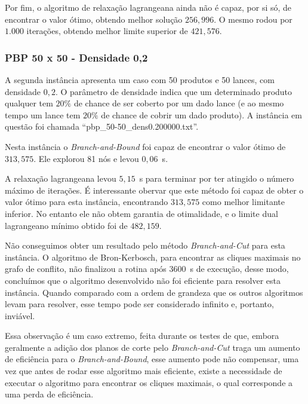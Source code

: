 \documentclass{article}
\begin{document}
    Por fim, o algoritmo de relaxação lagrangeana ainda não é capaz, por si só, de encontrar o valor ótimo, obtendo melhor solução $256{,}996$. O mesmo rodou por $1.000$ iterações, obtendo melhor limite superior de $421{,}576$.


    
    \subsubsection{PBP 50 x 50 - Densidade 0,2}
    
    
    A segunda instância apresenta um caso com 50 produtos e 50 lances, com densidade $0{,}2$. O parâmetro de densidade indica que um determinado produto qualquer tem $20\%$ de chance de ser coberto por um dado lance (e ao mesmo tempo um lance tem $20\%$ de chance de cobrir um dado produto). A instância em questão foi chamada \enquote{pbp\_50-50\_dens0.200000.txt}.
    
    Nesta instância o \emph{Branch-and-Bound} foi capaz de encontrar o valor ótimo de $313{,}575$. Ele explorou 81 nós e levou $0{,}06$~s. 
    
    A relaxação lagrangeana levou $5{,}15$~s para terminar por ter atingido o número máximo de iterações. É interessante obervar que este método foi capaz de obter o valor ótimo para esta instância, encontrando $313{,}575$ como melhor limitante inferior. No entanto ele não obtem garantia de otimalidade, e o limite dual lagrangeano mínimo obtido foi de $482{,}159$.
    
    Não conseguimos
    obter um resultado pelo método \emph{Branch-and-Cut} para esta instância. O algoritmo de Bron-Kerbosch, para encontrar as cliques maximais no grafo de conflito, não finalizou a rotina após $3600$~s de execução, desse modo, concluímos que o algoritmo desenvolvido não foi eficiente para resolver esta instância. Quando comparado com a ordem de grandeza que os outros algoritmos levam para resolver, esse tempo pode ser considerado infinito e, portanto, inviável.
    
    Essa observação é um caso extremo, feita durante os testes de que, embora geralmente a adição dos planos de corte pelo \emph{Branch-and-Cut} traga um aumento de eficiência para o \emph{Branch-and-Bound}, esse aumento pode não compensar, uma vez que antes de rodar esse algoritmo mais eficiente, existe a necessidade de executar o algoritmo para encontrar os cliques maximais, o qual corresponde a uma perda de eficiência.
    
\end{document}
